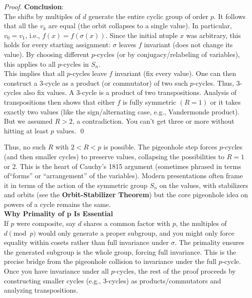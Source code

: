 \begin{proof}
{\bf Conclusion}:\\

The shifts by multiples of $d$ generate the entire cyclic group of order $p$.
It follows that all the $v_k$ are equal (the orbit collapses to a single value).
In particular, $v_0 = v_1$, i.e., $f(x) = f(\sigma(x))$.
Since the initial  ntuple $x$ was arbitrary, this holds for every starting assignment: $\sigma$ leaves $f$ invariant (does not change its value).
By choosing different $p$-cycles (or by conjugacy/relabeling of variables), this applies to all $p$-cycles in $S_n$.\\

This implies that all $p$-cycles leave $f$ invariant (fix every value).
One can then construct a 3-cycle as a product (or commutator) of two such $p$-cycles. Thus, 3-cycles also fix values.
A 3-cycle is a product of two transpositions. 
Analysis of transpositions then shows that either $f$ is fully symmetric $(R = 1)$ or it takes exactly two values (like the sign/alternating case, e.g., Vandermonde product).
But we assumed $R > 2$, a contradiction. You can't get three or more without hitting at least $p$ values.  \qed

\end{proof}


Thus, no such $R$ with $2 < R < p$ is possible. The pigeonhole step forces $p$-cycles (and then smaller cycles) to preserve values, collapsing the possibilities to $R = 1$ or $2$.
This is the heart of Cauchy's 1815 argument (sometimes phrased in terms of``forms'' or ``arrangement'' of the variables). 
Modern presentations often frame it in terms of the action of the symmetric group $S_n$ on the values, with stabilizers and orbits (see the {\bf Orbit-Stabilizer Theorem}) 
but the core pigeonhole idea on powers of a cycle remains the same.\\

{\bf Why Primality of p Is Essential}\\
If $p$ were composite, say $d$ shares a common factor with $p$, the multiples of $d \pmod{p}$ would only generate a proper subgroup, 
and you might only force equality within cosets rather than full invariance under $\sigma$. 
The primality ensures the generated subgroup is the whole group, forcing full invariance.
This is the precise bridge from the pigeonhole collision to invariance under the full $p$-cycle. 
Once you have invariance under all $p$-cycles, the rest of the proof proceeds by constructing smaller cycles (e.g., 3-cycles) as products/commutators and analyzing transpositions.\\
